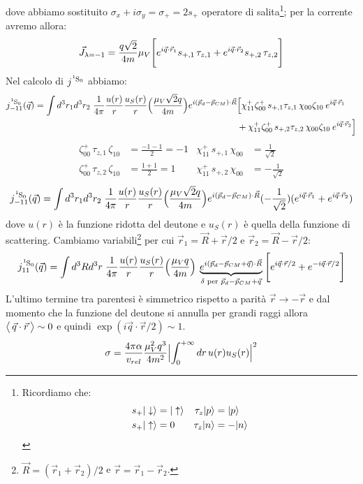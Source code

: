 dove abbiamo sostituito $\sigma_x + i \sigma_y = \sigma_+ = 2s_+$ operatore di salita\footnote{Ricordiamo che:%
\begin{displaymath}
\begin{aligned}
s_{+}|\downarrow\rangle &= |\uparrow\rangle & \tau_z |p\rangle &= |p\rangle \\
s_{+}|\uparrow\rangle &= 0 & \tau_z |n\rangle &= -|n\rangle
\end{aligned}
\end{displaymath}%
}; per la corrente avremo allora:
$$\vec{J}_{\lambda=-1} = \frac{q\sqrt{2}}{4m} \mu_V \Biggl [ e^{i\vec{q}\cdot\vec{r}_1}s_{+,1}\,\tau_{z,1} + e^{i\vec{q}\cdot\vec{r}_2}s_{+,2}\,\tau_{z,2} \Biggr ] $$
Nel calcolo di $j^{\ce{^1S_0}}$ abbiamo:
\begin{displaymath}
\begin{aligned}
j^{\ce{^1S_0}}_{-11}(\vec{q}) = \int d^3r_1d^3r_2\; \frac{1}{4\pi}\frac{u(r)}{r}\frac{u_S(r)}{r}\ppc{\frac{\mu_V\sqrt{2}q}{4m}}e^{i(\vec{p}_d-\vec{p}_{CM})\cdot \vec{R}} &\Bigl [ \chi_{11}^+\zeta_{00}^+\, s_{+,1} \tau_{z,1}\, \chi_{00}\zeta_{10}\:e^{i\vec{q}\cdot\vec{r}_1} \\
&+ \chi_{11}^+\zeta_{00}^+\, s_{+,2} \tau_{z,2}\, \chi_{00}\zeta_{10}\:e^{i\vec{q}\cdot\vec{r}_2}\Bigr ]
\end{aligned}
\end{displaymath}
\begin{displaymath}
\begin{aligned}
\zeta_{00}^+\, \tau_{z,1}\, \zeta_{10} &= \frac{-1-1}{2} =-1  & \chi_{11}^+\, s_{+,1}\, \chi_{00} &= \frac{1}{\sqrt{2}} \\
\zeta_{00}^+\, \tau_{z,2}\, \zeta_{10} &= \frac{1+1}{2} = 1 & \chi_{11}^+\, s_{+,2}\, \chi_{00} &= -\frac{1}{\sqrt{2}} 
\end{aligned}
\end{displaymath}
$$j^{\ce{^1S_0}}_{-11}(\vec{q}) = \int d^3r_1d^3r_2\; \frac{1}{4\pi}\frac{u(r)}{r}\frac{u_S(r)}{r}\ppc{\frac{\mu_V\sqrt{2}q}{4m}}e^{i(\vec{p}_d-\vec{p}_{CM})\cdot \vec{R}}(-\frac{1}{\sqrt{2}})(e^{i\vec{q}\cdot\vec{r}_1}+e^{i\vec{q}\cdot\vec{r}_2})$$
dove $u(r)$ è la funzione ridotta del deutone e $u_S(r)$ è quella della funzione di scattering. Cambiamo variabili\footnote{$\vec{R}=(\vec{r}_1+\vec{r}_2)/2$ e $\vec{r}=\vec{r}_1-\vec{r}_2$.} per cui $\vec{r}_1 = \vec{R}+\vec{r}/2$ e $\vec{r}_2 = \vec{R}-\vec{r}/2$:
$$j^{\ce{^1S_0}}_{11}(\vec{q}) = \int d^3Rd^3r\; \frac{1}{4\pi}\frac{u(r)}{r}\frac{u_S(r)}{r}\ppc{\frac{\mu_V q}{4m}}\: \underbrace{e^{i(\vec{p}_d-\vec{p}_{CM}+\vec{q})\cdot \vec{R}}}_{\delta \text{ per } \vec{p}_d-\vec{p}_{CM}+\vec{q}}\:
\PPq{e^{i\vec{q}\cdot\vec{r}/2}+e^{-i\vec{q}\cdot\vec{r}/2}}$$
L'ultimo termine tra parentesi è simmetrico rispetto a parità $\vec{r}\to -\vec{r}$ e dal momento che la funzione del deutone si annulla per grandi raggi allora $\bigl\langle\, \vec{q}\cdot\vec{r}\, \bigr\rangle\sim 0$ e quindi $\exp{(i\vec{q}\cdot\vec{r}/2)}\sim 1$.
$$\sigma = \frac{4\pi\alpha}{v_{rel}}\frac{\mu^2_V q^3}{4m^2} \Bigl |\int_0^{+\infty} dr \, u(r) u_S(r)\Bigr |^2$$



